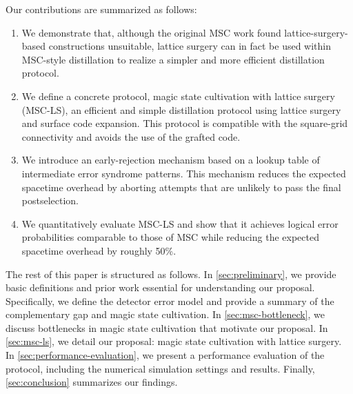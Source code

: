 Our contributions are summarized as follows:
\begin{enumerate}
 \item We demonstrate that, although the original MSC work found lattice-surgery-based constructions unsuitable, lattice surgery can in fact be used within MSC-style distillation to realize a simpler and more efficient distillation protocol.
 \item We define a concrete protocol, magic state cultivation with lattice surgery (MSC-LS), an efficient and simple distillation protocol using lattice surgery and surface code expansion. This protocol is compatible with the square-grid connectivity and avoids the use of the grafted code.
 \item We introduce an early-rejection mechanism based on a lookup table of intermediate error syndrome patterns. This mechanism reduces the expected spacetime overhead by aborting attempts that are unlikely to pass the final postselection.
 \item We quantitatively evaluate MSC-LS and show that it achieves logical error probabilities comparable to those of MSC while reducing the expected spacetime overhead by roughly 50\%.
\end{enumerate}

The rest of this paper is structured as follows.
In \autoref{sec:preliminary}, we provide basic definitions and prior work essential for understanding our proposal.
Specifically, we define the detector error model and provide a summary of the complementary gap and magic state cultivation.
In \autoref{sec:msc-bottleneck}, we discuss bottlenecks in magic state cultivation that motivate our proposal.
In \autoref{sec:msc-ls}, we detail our proposal: magic state cultivation with lattice surgery.
In \autoref{sec:performance-evaluation}, we present a performance evaluation of the protocol, including the numerical simulation settings and results.
Finally, \autoref{sec:conclusion} summarizes our findings.